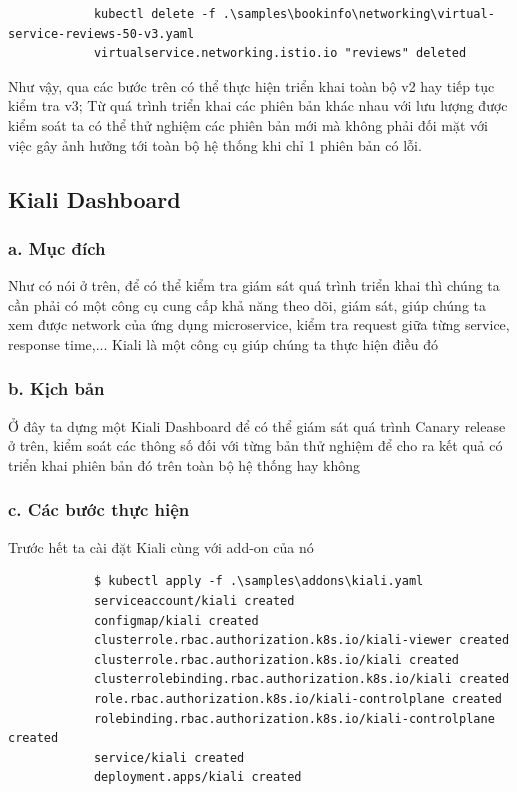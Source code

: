 \documentclass[12pt,a4paper]{report}
\begin{document}
{{\begin{lstlisting}
			kubectl delete -f .\samples\bookinfo\networking\virtual-service-reviews-50-v3.yaml
			virtualservice.networking.istio.io "reviews" deleted
		\end{lstlisting}
		Như vậy, qua các bước trên có thể thực hiện triển khai toàn bộ v2 hay tiếp tục kiểm tra v3; Từ quá trình triển khai các phiên bản khác nhau với lưu lượng được kiểm soát ta có thể thử nghiệm các phiên bản mới mà không phải đối mặt với việc gây ảnh hưởng tới toàn bộ hệ thống khi chỉ 1 phiên bản có lỗi.
		\subsection{Kiali Dashboard}
		\subsubsection{a. Mục đích}
		Như có nói ở trên, để có thể kiểm tra giám sát quá trình triển khai thì chúng ta cần phải có một công cụ cung cấp khả năng theo dõi, giám sát, giúp chúng ta xem được network của ứng dụng microservice, kiểm tra request giữa từng service, response time,... Kiali là một công cụ giúp chúng ta thực hiện điều đó
		\subsubsection{b. Kịch bản}
		Ở đây ta dựng một Kiali Dashboard để có thể giám sát quá trình Canary release ở trên, kiểm soát các thông số đối với từng bản thử nghiệm để cho ra kết quả có triển khai phiên bản đó trên toàn bộ hệ thống hay không
		\subsubsection{c. Các bước thực hiện}
		Trước hết ta cài đặt Kiali cùng với add-on của nó
		\begin{lstlisting}
			$ kubectl apply -f .\samples\addons\kiali.yaml
			serviceaccount/kiali created
			configmap/kiali created
			clusterrole.rbac.authorization.k8s.io/kiali-viewer created
			clusterrole.rbac.authorization.k8s.io/kiali created
			clusterrolebinding.rbac.authorization.k8s.io/kiali created
			role.rbac.authorization.k8s.io/kiali-controlplane created
			rolebinding.rbac.authorization.k8s.io/kiali-controlplane created
			service/kiali created
			deployment.apps/kiali created
			

\end{lstlisting}}}
\end{document}
